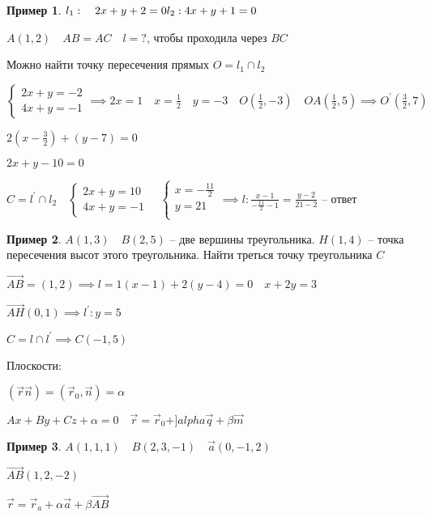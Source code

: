 \documentclass{book}
\newcommand{\p}[1]{#1^{\prime}}
\theoremstyle{definition}
\newtheorem*{example}{Пример}
\newcommand\vect[1]{\overset{\longrightarrow}{#1}}
\begin{document}
\begin{example}
    $l_1:\quad 2x+y+2 = 0\\ l_2:4x+y+1=0\\ $

    $A(1, 2)\quad AB=AC\quad l=?$, чтобы проходила через  $BC$

     Можно найти точку пересечения прямых  $O = l_1\cap l_2$

     $\begin{cases}
         2x+y = -2\\
         4x+y = -1
     \end{cases} \implies  2x=1\quad x = \frac{1}{2}\quad y = -3\quad O(\frac{1}{2}, -3)\quad OA(\frac{1}{2}, 5) \implies \p O(\frac{3}{2}, 7)$ 

     $2(x-\frac{3}{2}) + (y-7) = 0$ 

     $2x+y -10 = 0$

    $C = \p l\cap l_2\quad \begin{cases}
        2x+y=10\\ 4x+y = -1
    \end{cases}\quad \begin{cases}
        x = -\frac{11}{2}\\
        y = 21\\
    \end{cases} \implies l: \frac{x-1}{-\frac{11}{2}-1} = \frac{y-2}{21-2} $ -- ответ
\end{example}

\begin{example}
    $A(1, 3)\quad B(2, 5)$ -- две вершины треугольника.  $H(1,4)$ -- точка пересечения высот этого треугольника. Найти треться точку треугольника $C$

    $\vect{AB} = (1, 2) \implies l = 1(x-1) +2(y-4) = 0\quad x+2y=3$

    $\vect{AH}(0,1) \implies \p l: y=5$ 

    $C = l\cap \p l \implies C(-1, 5)$
\end{example}

Плоскости:

$(\vec r\vec n) = (\vec r_0, \vec n) = \alpha$

$Ax+By+Cz+\alpha = 0\quad \vec r = \vec r_0 + ]alpha \vec q + \beta \vec m$

\begin{example}
    $A(1, 1, 1)\quad B(2, 3, -1)\quad \vec a(0, -1, 2)$

    $\vect{AB}(1, 2, -2)$

    $\vec r = \vec r_a + \alpha \vec a + \beta \vect{AB}$
\end{example}
\end{document}
